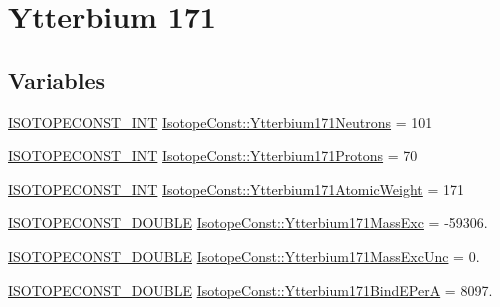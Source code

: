 \hypertarget{group___isotope_const-_ytterbium-_yb171}{}\section{Ytterbium 171}
\label{group___isotope_const-_ytterbium-_yb171}
\subsection*{Variables}
\begin{DoxyCompactItemize}
\item 
\mbox{\hyperlink{group___isotope_const-_macros_ga5f18360b3e99483a35c32d789e62621c}{I\+S\+O\+T\+O\+P\+E\+C\+O\+N\+S\+T\+\_\+\+I\+NT}} \mbox{\hyperlink{group___isotope_const-_ytterbium-_yb171_ga9327d61f017df0f4d748ed253d382bf4}{Isotope\+Const\+::\+Ytterbium171\+Neutrons}} = 101
\item 
\mbox{\hyperlink{group___isotope_const-_macros_ga5f18360b3e99483a35c32d789e62621c}{I\+S\+O\+T\+O\+P\+E\+C\+O\+N\+S\+T\+\_\+\+I\+NT}} \mbox{\hyperlink{group___isotope_const-_ytterbium-_yb171_gad6e8d72b4282b688ed2a3090318e24e5}{Isotope\+Const\+::\+Ytterbium171\+Protons}} = 70
\item 
\mbox{\hyperlink{group___isotope_const-_macros_ga5f18360b3e99483a35c32d789e62621c}{I\+S\+O\+T\+O\+P\+E\+C\+O\+N\+S\+T\+\_\+\+I\+NT}} \mbox{\hyperlink{group___isotope_const-_ytterbium-_yb171_ga59d7755cb91eeafb3258ecc1adc7a1a5}{Isotope\+Const\+::\+Ytterbium171\+Atomic\+Weight}} = 171
\item 
\mbox{\hyperlink{group___isotope_const-_macros_ga8f45a7272ce02c0b4c65c44636ed719a}{I\+S\+O\+T\+O\+P\+E\+C\+O\+N\+S\+T\+\_\+\+D\+O\+U\+B\+LE}} \mbox{\hyperlink{group___isotope_const-_ytterbium-_yb171_ga1f88d2d2466435426cffaf5a8bffd438}{Isotope\+Const\+::\+Ytterbium171\+Mass\+Exc}} = -\/59306.
\item 
\mbox{\hyperlink{group___isotope_const-_macros_ga8f45a7272ce02c0b4c65c44636ed719a}{I\+S\+O\+T\+O\+P\+E\+C\+O\+N\+S\+T\+\_\+\+D\+O\+U\+B\+LE}} \mbox{\hyperlink{group___isotope_const-_ytterbium-_yb171_ga8fc8405b87e1a05ed8ca275e348fbed5}{Isotope\+Const\+::\+Ytterbium171\+Mass\+Exc\+Unc}} = 0.
\item 
\mbox{\hyperlink{group___isotope_const-_macros_ga8f45a7272ce02c0b4c65c44636ed719a}{I\+S\+O\+T\+O\+P\+E\+C\+O\+N\+S\+T\+\_\+\+D\+O\+U\+B\+LE}} \mbox{\hyperlink{group___isotope_const-_ytterbium-_yb171_ga181f043136910e9b78bb3b80ab748821}{Isotope\+Const\+::\+Ytterbium171\+Bind\+E\+PerA}} = 8097.
\item 

\end{DoxyCompactItemize}

